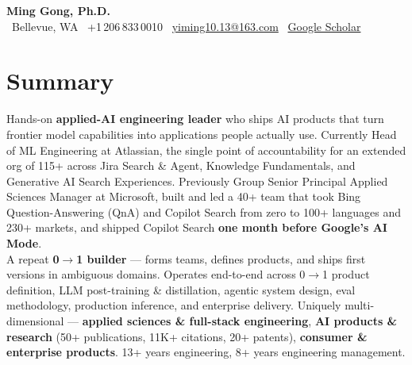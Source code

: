 \documentclass[10.5pt,letterpaper]{article}
\begin{document}
\begin{center}
  {\LARGE\bfseries\color{accent} Ming Gong, Ph.D.}\\[3pt]
  \textcolor{contactgray}{\faMapMarker* \ Bellevue, WA \quad \textbar \quad
  \faPhone \ +1\,206\,833\,0010 \quad \textbar \quad
  \faEnvelope \ \href{mailto:yiming10.13@163.com}{yiming10.13@163.com} \quad \textbar \quad
  \faGraduationCap \ \href{https://scholar.google.com/citations?user=c7JEFwsAAAAJ}{Google Scholar}}
\end{center}

\section*{Summary}
Hands-on \textbf{applied-AI engineering leader} who ships AI products that turn frontier model capabilities into applications people actually use. Currently Head of ML Engineering at Atlassian, the single point of accountability for an extended org of 115+ across Jira Search \& Agent, Knowledge Fundamentals, and Generative AI Search Experiences. Previously Group Senior Principal Applied Sciences Manager at Microsoft, built and led a 40+ team that took Bing Question-Answering (QnA) and Copilot Search from zero to 100+ languages and 230+ markets, and shipped Copilot Search \textbf{one month before Google's AI Mode}.\\[4pt]
A repeat \textbf{0$\to$1 builder} --- forms teams, defines products, and ships first versions in ambiguous domains. Operates end-to-end across 0$\to$1 product definition, LLM post-training \& distillation, agentic system design, eval methodology, production inference, and enterprise delivery. Uniquely multi-dimensional --- \textbf{applied sciences \& full-stack engineering}, \textbf{AI products \& research} (50+ publications, 11K+ citations, 20+ patents), \textbf{consumer \& enterprise products}. 13+ years engineering, 8+ years engineering management.

\end{document}
